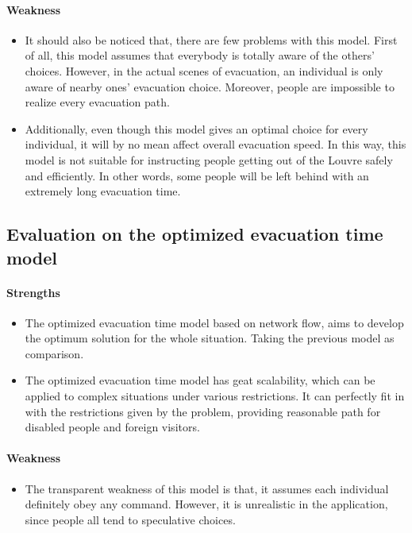 \documentclass{mcmthesis}
\begin{document}
\paragraph{Weakness}
\begin{itemize}
	\item It should also be noticed that, there are few problems with this model. First of all, this model assumes that everybody is totally aware of the others' choices. However, in the actual scenes of evacuation, an individual is only aware of nearby ones' evacuation choice. Moreover, people are impossible to realize every evacuation path. 
	\item Additionally, even though this model gives an optimal choice for every individual, it will by no mean affect overall evacuation speed. In this way, this model is not suitable for instructing people getting out of the Louvre safely and efficiently. In other words, some people will be left behind with an extremely long evacuation time.
\end{itemize}

\subsection{Evaluation on the optimized evacuation time model}
\paragraph{Strengths}

\begin{itemize}
	\item The optimized evacuation time model based on network flow, aims to develop the optimum solution for the whole situation. Taking the previous model as comparison.
	\item The optimized evacuation time model has geat scalability, which can be applied to complex situations under various restrictions. It can perfectly fit in with the restrictions given by the problem, providing reasonable path for disabled people and foreign visitors.
\end{itemize}

\paragraph{Weakness}
\begin{itemize}
	\item The transparent weakness of this model is that, it assumes each individual definitely obey any command. However, it is unrealistic in the application, since people all tend to speculative choices.

\end{itemize}
\end{document}
